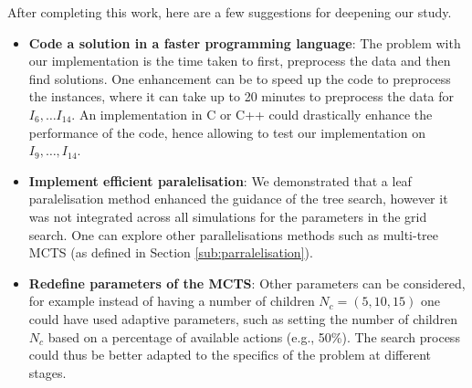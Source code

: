 After completing this work, here are a few suggestions for deepening our study.
\begin{itemize}
    \item \textbf{Code a solution in a faster programming language}: The problem with our implementation is the time taken to first, preprocess the data and then find solutions. One enhancement can be to speed up the code to preprocess the instances, where it can take up to 20 minutes to preprocess the data for $I_6, \ldots I_{14}$. An implementation in C or C++ could drastically enhance the performance of the code, hence allowing to test our implementation on $I_9, \ldots, I_{14}$.
    \item \textbf{Implement efficient paralelisation}: We demonstrated that a leaf paralelisation method enhanced the guidance of the tree search, however it was not integrated across all simulations for the parameters in the grid search. One can explore other parallelisations methods such as multi-tree MCTS (as defined in Section \ref{sub:parralelisation}).
    \item \textbf{Redefine parameters of the MCTS}: Other parameters can be considered, for example instead of having a number of children $N_c=(5,10,15)$ one could have used adaptive parameters, such as setting the number of children $N_c$ based on a percentage of available actions (e.g., 50\%). The search process could thus be better adapted to the specifics of the problem at different stages.
\end{itemize}
